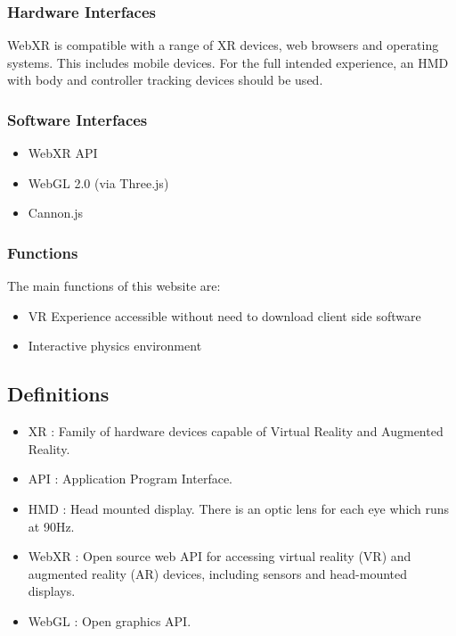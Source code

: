 \subsubsection{Hardware Interfaces}
WebXR is compatible with a range of XR devices, web browsers and operating systems. This includes mobile devices. For the full intended experience, an HMD with body and controller tracking devices should be used.

\subsubsection{Software Interfaces}
\begin{itemize}
    \item WebXR API
    \item WebGL 2.0 (via Three.js)
    \item Cannon.js
\end{itemize}

\subsubsection{Functions}
The main functions of this website are:
\begin{itemize}
    \item VR Experience accessible without need to download client side software 
    \item Interactive physics environment
\end{itemize}
\subsection{Definitions}
\begin{itemize}
    \item XR : Family of hardware devices capable of Virtual Reality and Augmented Reality.
    \item API : Application Program Interface.
    \item HMD : Head mounted display. There is an optic lens for each eye which runs at 90Hz.
    \item WebXR : Open source web API for accessing virtual reality (VR) and augmented reality (AR) devices, including sensors and head-mounted displays.
    \item WebGL : Open graphics API.
\end{itemize}